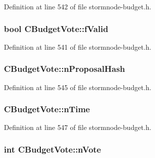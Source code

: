 Definition at line 542 of file stormnode-\/budget.\+h.

\hypertarget{class_c_budget_vote_a069471bf430ecee3065929591dc47aba}{}
\subsubsection[{f\+Valid}]{\setlength{\rightskip}{0pt plus 5cm}bool C\+Budget\+Vote\+::f\+Valid}\label{class_c_budget_vote_a069471bf430ecee3065929591dc47aba}


Definition at line 541 of file stormnode-\/budget.\+h.

\hypertarget{class_c_budget_vote_a185648d07f641e8d663afcbf7a7c1a24}{}
\subsubsection[{n\+Proposal\+Hash}]{ C\+Budget\+Vote\+::n\+Proposal\+Hash}\label{class_c_budget_vote_a185648d07f641e8d663afcbf7a7c1a24}


Definition at line 545 of file stormnode-\/budget.\+h.

\hypertarget{class_c_budget_vote_a7cde3552eacf54d86796d3ff48601125}{}
\subsubsection[{n\+Time}]{ C\+Budget\+Vote\+::n\+Time}\label{class_c_budget_vote_a7cde3552eacf54d86796d3ff48601125}


Definition at line 547 of file stormnode-\/budget.\+h.

\hypertarget{class_c_budget_vote_a6eafe2cf4bca2b25d5662b2601334a8d}{}
\subsubsection[{n\+Vote}]{\setlength{\rightskip}{0pt plus 5cm}int C\+Budget\+Vote\+::n\+Vote}\label{class_c_budget_vote_a6eafe2cf4bca2b25d5662b2601334a8d}


